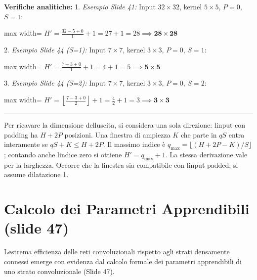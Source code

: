 \documentclass[11pt,a4paper,oneside,openany]{book}
\begin{document}
\textbf{Verifiche analitiche:} 1. \emph{Esempio Slide 41:} Input \(32 \times 32\), kernel \(5 \times 5\), \(P = 0\), \(S = 1\): \begin{center}
\begin{adjustbox}{max width=\linewidth}
$\displaystyle 
   H' = \frac{32 - 5 + 0}{1} + 1 = 27 + 1 = 28 \implies \mathbf{28 \times 28}
   $
\end{adjustbox}
\end{center} 2. \emph{Esempio Slide 44 (S=1):} Input \(7 \times 7\), kernel \(3 \times 3\), \(P = 0\), \(S = 1\): \begin{center}
\begin{adjustbox}{max width=\linewidth}
$\displaystyle 
   H' = \frac{7 - 3 + 0}{1} + 1 = 4 + 1 = 5 \implies \mathbf{5 \times 5}
   $
\end{adjustbox}
\end{center} 3. \emph{Esempio Slide 44 (S=2):} Input \(7 \times 7\), kernel \(3 \times 3\), \(P = 0\), \(S = 2\): \begin{center}
\begin{adjustbox}{max width=\linewidth}
$\displaystyle 
   H' = \left\lfloor \frac{7 - 3 + 0}{2} \right\rfloor + 1 = \frac{4}{2} + 1 = 3 \implies \mathbf{3 \times 3}
   $
\end{adjustbox}
\end{center}

\begin{center}\rule{0.5\linewidth}{0.5pt}\end{center}

Per ricavare la dimensione dell\textquotesingle uscita, si considera una sola direzione: l\textquotesingle input con padding ha \(H+2P\) posizioni. Una finestra di ampiezza \(K\) che parte in \(qS\) entra interamente se \(qS+K\leq H+2P\). Il massimo indice è \(q_{\max}=\lfloor(H+2P-K)/S\rfloor\); contando anche l\textquotesingle indice zero si ottiene \(H'=q_{\max}+1\). La stessa derivazione vale per la larghezza. Occorre che la finestra sia compatibile con l\textquotesingle input padded; si assume dilatazione 1.

\section{Calcolo dei Parametri Apprendibili (slide 47)}\label{f02-r618}

L\textquotesingle estrema efficienza delle reti convoluzionali rispetto agli strati densamente connessi emerge con evidenza dal calcolo formale dei parametri apprendibili di uno strato convoluzionale (Slide 47).
\end{document}
